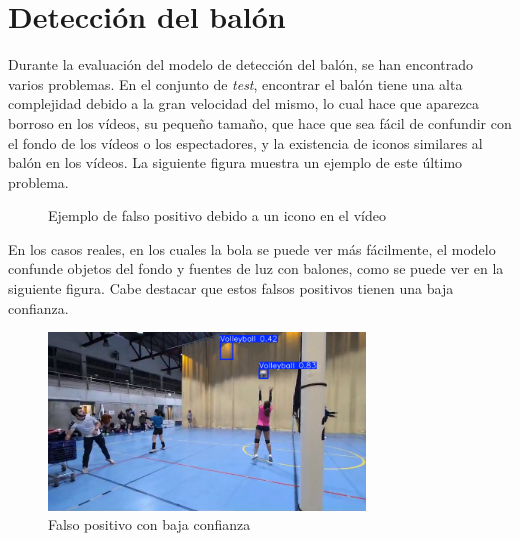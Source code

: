 \documentclass[12pt]{report} %
\begin{document}
    \section{Detección del balón}
    Durante la evaluación del modelo de detección del balón, se han encontrado
    varios problemas. En el conjunto de \textit{test}, encontrar el balón tiene
    una alta complejidad debido a la gran velocidad del mismo, lo cual hace que
    aparezca borroso en los vídeos, su pequeño tamaño, que hace que sea fácil de
    confundir con el fondo de los vídeos o los espectadores, y la existencia de
    iconos similares al balón en los vídeos. La siguiente figura muestra un
    ejemplo de este último problema.

    \begin{figure}[H]
        \centering
        \caption{Ejemplo de falso positivo debido a un icono en el vídeo}
    \end{figure}

    En los casos reales, en los cuales la bola se puede ver más fácilmente, el
    modelo confunde objetos del fondo y fuentes de luz con balones, como se
    puede ver en la siguiente figura. Cabe destacar que estos falsos positivos
    tienen una baja confianza.

    \begin{figure}[H]
    \includegraphics[width=0.75\textwidth]{bola1.png}
    \caption{Falso positivo con baja confianza}
    \end{figure}
\end{document}
